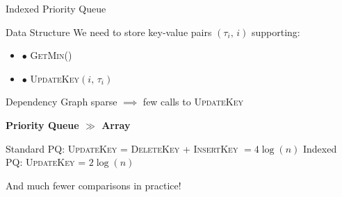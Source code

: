 \documentclass{beamer}
\begin{document}
\begin{frame}{Indexed Priority Queue}
  \begin{block}{Data Structure}
    We need to store key-value pairs $\left(\tau_i,\, i\right)$ supporting:
    \begin{itemize}
    \item $\bullet$ \textsc{GetMin}()
    \item $\bullet$ \textsc{UpdateKey}$\left(i, \, \tau_i\right)$
    \end{itemize}
  \end{block}
  \vspace{5pt}
  Dependency Graph sparse $\implies$ few calls to \textsc{UpdateKey}
  \begin{center}
    \textbf{Priority Queue $\pmb{\gg}$ Array}
  \end{center}
  Standard PQ: \textsc{UpdateKey} = \textsc{DeleteKey} + \textsc{InsertKey} $= 4\log(n)$
  Indexed PQ: \textsc{UpdateKey} = $2\log(n)$ \\
  \begin{center}
    And much fewer comparisons in practice!
  \end{center}

\end{frame}
\end{document}
